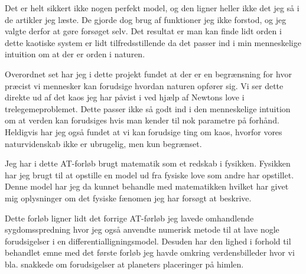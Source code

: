 \documentclass[12pt,a4paper]{article}
\theoremstyle{break}
\theoremstyle{nonumberplain}
\begin{document}
Det er helt sikkert ikke nogen perfekt model, og den ligner heller ikke det jeg så i de artikler jeg læste. 
De gjorde dog brug af funktioner jeg ikke forstod, og jeg valgte derfor at gøre forsøget selv.
Det resultat er man kan finde lidt orden i dette kaotiske system er lidt tilfredsstillende da det passer ind i min menneskelige intuition om at der er orden i naturen. 

Overordnet set har jeg i dette projekt fundet at der er en begrænsning for hvor præcist vi mennesker kan forudsige hvordan naturen opfører sig. 
Vi ser dette direkte ud af det kaos jeg har påvist i ved hjælp af Newtons love i trelegemeproblemet. 
Dette passer ikke så godt ind i den menneskelige intuition om at verden kan forudsiges hvis man kender til nok parametre på forhånd. 
Heldigvis har jeg også fundet at vi kan forudsige ting om kaos, hvorfor vores naturvidenskab ikke er ubrugelig, men kun begrænset. 

Jeg har i dette AT-forløb brugt matematik som et redskab i fysikken. 
Fysikken har jeg brugt til at opstille en model ud fra fysiske love som andre har opstillet.
Denne model har jeg da kunnet behandle med matematikken hvilket har givet mig oplysninger om det fysiske fænomen jeg har forsøgt at beskrive.

Dette forløb ligner lidt det forrige AT-førløb jeg lavede omhandlende sygdomsspredning hvor jeg også anvendte numerisk metode til at lave nogle forudsigelser i en differentialligningsmodel. 
Desuden har den lighed i forhold til behandlet emne med det første forløb jeg havde omkring verdensbilleder hvor vi bla. snakkede om forudsigelser at planeters placeringer på himlen.
\end{document}
